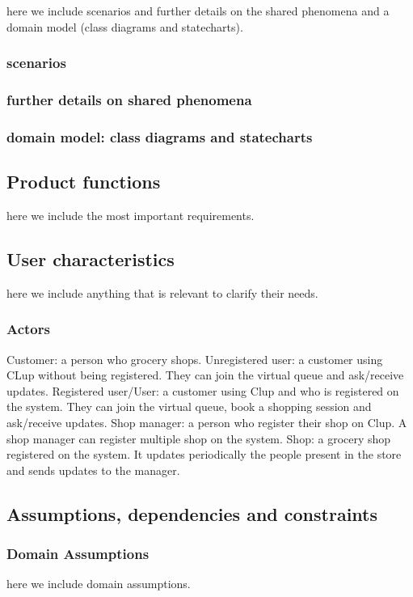 here we include scenarios and further details on the shared phenomena and a domain model (class diagrams and statecharts).

\subsubsection{scenarios}
\label{subsubsect:scenarios}

\subsubsection{further details on shared phenomena}
\label{subsubsect:furtherdetailsonsharedphenomena}

\subsubsection{domain model: class diagrams and statecharts}
\label{subsubsect:domainmodel}

\subsection{Product functions}
\label{subsect:productfunctions}

here we include the most important requirements.

\subsection{User characteristics}
\label{subsect:usercharacteristics}

here we include anything that is relevant to clarify their needs.

\subsubsection{Actors}
\label{subsubsect:actors}

Customer: a person who grocery shops.
Unregistered user: a customer using CLup without being registered. They can join the virtual queue and ask/receive updates.
Registered user/User: a customer using Clup and who is registered on the system. They can join the virtual queue, book a shopping session and ask/receive updates.
Shop manager: a person who register their shop on Clup. A shop manager can register multiple shop on the system.
Shop: a grocery shop registered on the system. It updates periodically the people present in the store and sends updates to the manager.

\subsection{Assumptions, dependencies and constraints}
\label{subsect:assumptionsdependenciescostraints}

\subsubsection{Domain Assumptions}
\label{subsubsect:domainassumptions}

here we include domain assumptions.

